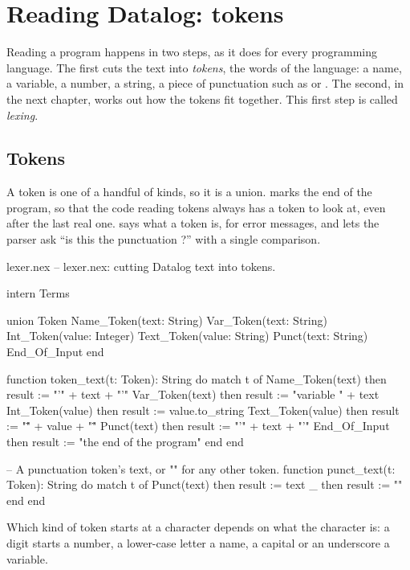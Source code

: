 \chapter{Reading Datalog: tokens}\label{ch:lexer}

Reading a program happens in two steps, as it does for every programming
language. The first cuts the text into \emph{tokens}, the words of the
language: a name, a variable, a number, a string, a piece of punctuation
such as \code{:-} or \code{(}. The second, in the next chapter, works out
how the tokens fit together. This first step is called \emph{lexing}.

\section{Tokens}

A token is one of a handful of kinds, so it is a union. 
marks the end of the program, so that the code reading tokens always has a
token to look at, even after the last real one.  says what
a token is, for error messages, and  lets the parser ask
``is this the punctuation \code{(}?'' with a single comparison.

\begin{newfile}{lexer.nex}
-- lexer.nex: cutting Datalog text into tokens.

intern Terms

union Token
  Name_Token(text: String)
  Var_Token(text: String)
  Int_Token(value: Integer)
  Text_Token(value: String)
  Punct(text: String)
  End_Of_Input
end

function token_text(t: Token): String
do
  match t of
    Name_Token(text) then result := "'" + text + "'"
    Var_Token(text)  then result := "variable " + text
    Int_Token(value) then result := value.to_string
    Text_Token(value) then result := "\"" + value + "\""
    Punct(text)      then result := "'" + text + "'"
    End_Of_Input     then result := "the end of the program"
  end
end

-- A punctuation token's text, or "" for any other token.
function punct_text(t: Token): String
do
  match t of
    Punct(text) then result := text
    _           then result := ""
  end
end
\end{newfile}

Which kind of token starts at a character depends on what the character
is: a digit starts a number, a lower-case letter a name, a capital or an
underscore a variable.

